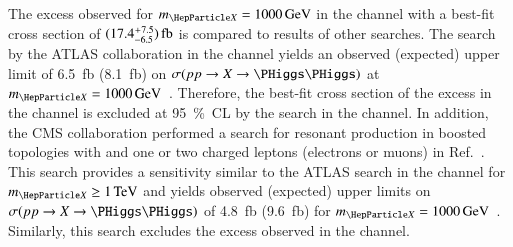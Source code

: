 The excess observed for $\mX = \SI{1000}{\GeV}$ in the \bbtautau channel with a
best-fit cross section of
$(17.4^{\hspace{0.25pt}+\hspace{0.25pt}7.5}_{-6.5})\valuesep\si{\femto\barn}$ is
compared to results of other searches. The search by the ATLAS collaboration in
the \bbbb channel yields an observed (expected) upper limit of
\SI{6.5}{\femto\barn} (\SI{8.1}{\femto\barn}) on $\sigma(\pp \to X \to \HH)$ at
$\mX = \SI{1000}{\GeV}$~\cite{HDBS-2018-41,hepdata.111124}. Therefore, the
best-fit cross section of the excess in the \bbtautau channel is excluded at
\SI{95}{\percent}~CL by the search in the \bbbb channel. In addition, the CMS
collaboration performed a search for resonant \HH production in boosted
topologies with \bbbar and one or two charged leptons (electrons or muons) in
Ref.~\cite{CMS-B2G-20-007}. This search provides a sensitivity similar to the
ATLAS search in the \bbbb channel for $\mX \geq \SI{1}{\TeV}$ and yields
observed (expected) upper limits on $\sigma(\pp \to X \to \HH)$ of
\SI{4.8}{\femto\barn} (\SI{9.6}{\femto\barn}) for
$\mX = \SI{1000}{\GeV}$~\cite{CMS-B2G-20-007,hepdata.115024}. Similarly, this
search excludes the excess observed in the \bbtautau channel.




